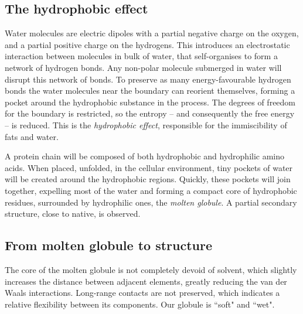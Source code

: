 
\subsection{The hydrophobic effect}
Water molecules are electric dipoles with a partial negative charge on the oxygen, and a partial positive charge on the hydrogens.
This introduces an electrostatic interaction between molecules in bulk of water, that self-organises to form a network of hydrogen bonds.
Any non-polar molecule submerged in water will disrupt this network of bonds.
To preserve as many energy-favourable hydrogen bonds the water molecules near the boundary can reorient themselves, forming a pocket around the hydrophobic substance in the process.
The degrees of freedom for the boundary is restricted, so the entropy -- and consequently the free energy -- is reduced.
This is the \emph{hydrophobic effect}, responsible for the immiscibility of fats and water.

A protein chain  
will be composed of both hydrophobic and hydrophilic amino acids.
When placed, unfolded, in the cellular environment, tiny pockets of water will be created around the hydrophobic regions.
Quickly, these pockets will join together, expelling most of the water and forming a compact core of hydrophobic residues, surrounded by hydrophilic ones, the \emph{molten globule}.
A partial secondary structure, close to native, is observed.

\subsection{From molten globule to structure}
The core of the molten globule is not completely devoid of solvent, which slightly increases the distance between adjacent elements, greatly reducing the van der Waals interactions.
Long-range contacts are not preserved, which indicates a relative flexibility between its components.
Our globule is ``soft" and ``wet".

